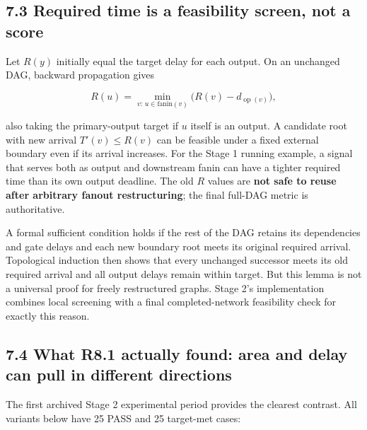 \documentclass[a4paper,10pt]{article}
\theoremstyle{definition}
\theoremstyle{remark}
\begin{document}
\subsection{7.3 Required time is a feasibility screen, not a score}\label{required-time-is-a-feasibility-screen-not-a-score}

Let \(R(y)\) initially equal the target delay for each output. On an unchanged DAG, backward propagation gives

\[
R(u)=\min_{v:\,u\in\mathrm{fanin}(v)}\bigl(R(v)-d_{\operatorname{op}(v)}\bigr),
\]

also taking the primary-output target if \(u\) itself is an output. A candidate root with new arrival \(T'(v)\le R(v)\) can be feasible under a fixed external boundary even if its arrival increases. For the Stage 1 running example, a signal that serves both as output and downstream fanin can have a tighter required time than its own output deadline. The old \(R\) values are \textbf{not safe to reuse after arbitrary fanout restructuring}; the final full-DAG metric is authoritative.

A formal sufficient condition holds if the rest of the DAG retains its dependencies and gate delays and each new boundary root meets its original required arrival. Topological induction then shows that every unchanged successor meets its old required arrival and all output delays remain within target. But this lemma is not a universal proof for freely restructured graphs. Stage 2's implementation combines local screening with a final completed-network feasibility check for exactly this reason.

\subsection{7.4 What R8.1 actually found: area and delay can pull in different directions}\label{what-r8.1-actually-found-area-and-delay-can-pull-in-different-directions}

The first archived Stage 2 experimental period provides the clearest contrast. All variants below have 25 PASS and 25 target-met cases:
\end{document}
